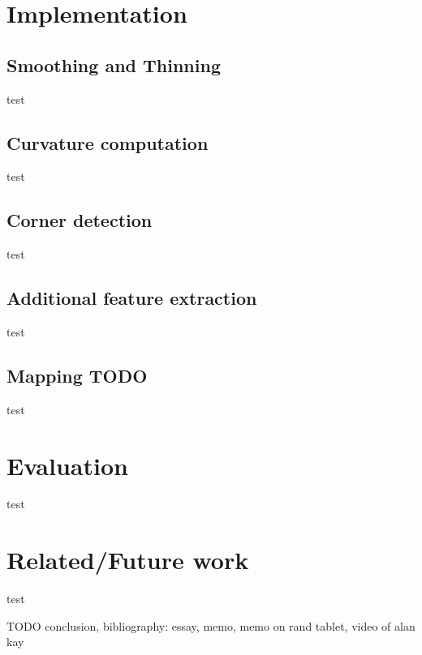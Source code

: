 \documentclass[sigconf]{acmart}
\begin{document}
\section{Implementation}

\subsection{Smoothing and Thinning}

test

\subsection{Curvature computation}

test

\subsection{Corner detection}

test

\subsection{Additional feature extraction}

test

\subsection{Mapping TODO}

test

\section{Evaluation}

test

\section{Related/Future work}

test

TODO conclusion, bibliography: essay, memo, memo on rand tablet, video of alan kay
\end{document}
